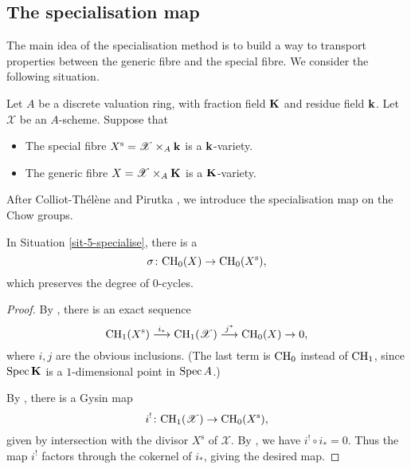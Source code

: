 \subsection{The specialisation map}

The main idea of the specialisation method 
is to build a way to transport properties
between the generic fibre and the special fibre.
We consider the following situation.

\begin{situation} \label{sit-5-specialise}
    Let $A$ be a discrete valuation ring,
    with fraction field $\bbK$ and residue field $\bbk$.
    Let $\mathscr{X}$ be an $A$-scheme. Suppose that
    \begin{itemize}
        \item
            The special fibre $X^{\mathrm{s}} = \mathscr{X} \times_A \bbk$ is a $\bbk$-variety.
        \item
            The generic fibre $X = \mathscr{X} \times_A \bbK$ is a $\bbK$-variety.
    \end{itemize}
\end{situation}

After Colliot-Thélène and Pirutka \cite{CTP},
we introduce the specialisation map on the Chow groups.

\begin{proposition} \label{thm-5-spe-map}
    In Situation \textup{\ref{sit-5-specialise}}, 
    there is a 
    \[ \sigma \colon \mathrm{CH}_0 (X) \to \mathrm{CH}_0 (X^{\mathrm{s}}), \]
    which preserves the degree of $0$-cycles.
\end{proposition}

\begin{proof}
    By \cite[\S1.8 and \S20.1]{fulton}, there is an exact sequence
    \[ \mathrm{CH}_1 (X^{\mathrm{s}}) \overset{i_*}{\longrightarrow} \mathrm{CH}_1 (\mathscr{X})
        \overset{j^*}{\longrightarrow} \mathrm{CH}_0 (X) \to 0, \]
    where $i, j$ are the obvious inclusions.
    (The last term is $\mathrm{CH}_0$ instead of $\mathrm{CH}_1$,
    since $\Spec \bbK$ is a $1$-dimensional point in $\operatorname{Spec} A$.)

    By \cite[\S2.6 and \S20.1]{fulton},
    there is a Gysin map
    \[ i^! \colon \mathrm{CH}_1 (\mathscr{X}) \to \mathrm{CH}_0 (X^{\mathrm{s}}), \]
    given by intersection with the divisor $X^{\mathrm{s}}$ of $\mathscr{X}$.
    By \cite[Proposition~2.6~(c)]{fulton},
    we have $i^! \circ i_* = 0$.
    Thus the map $i^!$ factors through the cokernel of $i_*$, giving the desired map.
\end{proof}

